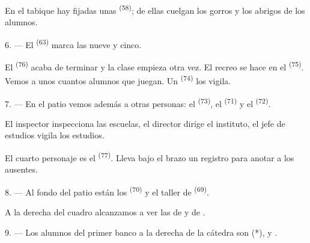 En el tabique hay fijadas unas  \textsuperscript{(58)}; de ellas
cuelgan los gorros y los abrigos de los alumnos.

\VUsaut{5.2mm}
\VUsaut{3.6mm}

6. --- El  \textsuperscript{(63)} marca las nueve y cinco.

El  \textsuperscript{(76)} acaba de terminar y la clase empieza otra
vez. El recreo se hace en el  \textsuperscript{(75)}. Vemos a unos
cuantos alumnos que juegan. Un  \textsuperscript{(74)} los vigila.

7. --- En el patio vemos además a otras personas: el 
\textsuperscript{(73)}, el  \textsuperscript{(71)} y el
 \textsuperscript{(72)}.

El inspector inspecciona las escuelas, el director dirige el instituto,
el jefe de estudios vigila los estudios.

El cuarto personaje es el  \textsuperscript{(77)}. Lleva bajo el
brazo un registro para anotar a los ausentes.

8. --- Al fondo del patio están los 
\textsuperscript{(70)} y el taller de  \textsuperscript{(69)}.

A la derecha del cuadro alcanzamos a ver las  de
 y de .


\VUsaut{2.4mm}

\VUsaut{3.0mm}

9. --- Los alumnos del primer banco a la derecha de la cátedra son
 (*),  y .

